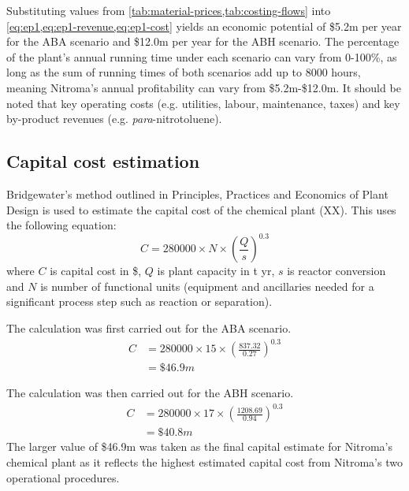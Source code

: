 Substituting values from \cref{tab:material-prices,tab:costing-flows} into \cref{eq:ep1,eq:ep1-revenue,eq:ep1-cost} yields an economic potential of \$5.2m per year for the ABA scenario and \$12.0m per year for the ABH scenario. The percentage of the plant's annual running time under each scenario can vary from 0-100\%, as long as the sum of running times of both scenarios add up to 8000 hours, meaning Nitroma's annual profitability can vary from \$5.2m-\$12.0m. It should be noted that key operating costs (e.g. utilities, labour, maintenance, taxes) and key by-product revenues (e.g. \textit{para}-nitrotoluene).

\subsection{Capital cost estimation}
Bridgewater's method outlined in Principles, Practices and Economics of Plant Design is used to estimate the capital cost of the chemical plant (XX). This uses the following equation:
\begin{equation}
    C= \num{280000} \times N \times \left(\frac{Q}{s}\right)^{0.3}
\end{equation}
where $C$ is capital cost in \$, $Q$ is  plant capacity in t yr, $s$ is reactor conversion and $N$ is number of functional units (equipment and ancillaries needed for a significant process step such as reaction or separation).

The calculation was first carried out for the ABA scenario.
\begin{align*}
C &= \num{280000} \times 15 \times \left(\frac{837.32}{0.27}\right)^{0.3}  \\
  &= \$46.9m 
\end{align*}

The calculation was then carried out for the ABH scenario.
\begin{align*}
C &= 280000 \times 17 \times \left(\frac{1208.69}{0.94}\right)^{0.3}  \\
  &=\$40.8m 
\end{align*}
The larger value of \$46.9m was taken as the final capital estimate for Nitroma's chemical plant as it reflects the highest estimated capital cost from Nitroma's two operational procedures.